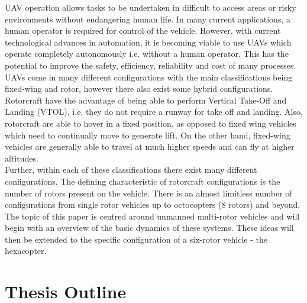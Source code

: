UAV operation allows tasks to be undertaken in difficult to access areas or risky environments without endangering human life. In many current applications, a human operator is required for control of the vehicle. However, with current technological advances in automation, it is becoming viable to use UAVs which operate completely autonomously i.e. without a human operator. This has the potential to improve the safety, efficiency, reliability and cost of many processes.\\

UAVs come in many different configurations with the main classifications being fixed-wing and rotor, however there also exist some hybrid configurations. Rotorcraft have the advantage of being able to perform Vertical Take-Off and Landing (VTOL), i.e. they do not require a runway for take off and landing. Also, rotorcraft are able to hover in a fixed position, as opposed to fixed wing vehicles which need to continually move to generate lift. On the other hand, fixed-wing vehicles are generally able to travel at much higher speeds and can fly at higher altitudes. \\

Further, within each of these classifications there exist many different configurations. The defining characteristic of rotorcraft configurations is the number of rotors present on the vehicle. There is an almost limitless number of configurations from single rotor vehicles up to octocopters (8 rotors) and beyond. The topic of this paper is centred around unmanned multi-rotor vehicles and will begin with an overview of the basic dynamics of these systems. These ideas will then be extended to the specific configuration of a six-rotor vehicle - the hexacopter.

\section{Thesis Outline}


\clearpage


